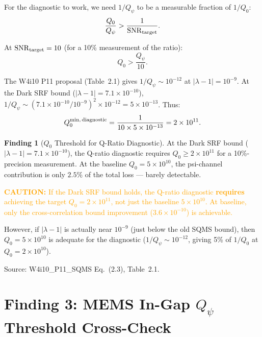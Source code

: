 \documentclass[11pt]{article}
\newcommand{\lbone}{|\lambda - 1|}
\newcommand{\Qpsi}{Q_\psi}
\newcommand{\ee}[1]{\times 10^{#1}}
\newcommand{\SNR}{\mathrm{SNR}}
\newcommand{\caution}[1]{\textcolor{orange}{\textbf{CAUTION:} #1}}
\theoremstyle{definition}
\newtheorem{finding}[theorem]{Finding}
\theoremstyle{remark}
\begin{document}
For the diagnostic to work, we need $1/Q_\psi$ to be a measurable
fraction of $1/Q_0$:
\begin{equation}
\frac{Q_0}{Q_\psi} > \frac{1}{\SNR_{\rm target}}.
\end{equation}

At $\SNR_{\rm target} = 10$ (for a 10\% measurement of the ratio):
\begin{equation}
Q_0 > \frac{Q_\psi}{10}.
\end{equation}

The W4i10 P11 proposal (Table~2.1) gives $1/Q_\psi \sim 10^{-12}$ at
$\lbone = 10^{-9}$. At the Dark SRF bound ($\lbone = 7.1\ee{-10}$),
$1/Q_\psi \sim (7.1\ee{-10}/10^{-9})^2\times 10^{-12} = 5\ee{-13}$.
Thus:
\begin{equation}
Q_0^{\rm min,\,diagnostic} = \frac{1}{10\times 5\ee{-13}} = 2\ee{11}.
\end{equation}

\begin{finding}[$Q_0$ Threshold for Q-Ratio Diagnostic]
\label{find:q0_threshold}
At the Dark SRF bound ($\lbone = 7.1\ee{-10}$), the Q-ratio
diagnostic requires $Q_0 \geq 2\ee{11}$ for a 10\%-precision
measurement. At the baseline $Q_0 = 5\ee{10}$, the psi-channel
contribution is only $2.5\%$ of the total loss --- barely detectable.

\caution{If the Dark SRF bound holds, the Q-ratio diagnostic
\textbf{requires} achieving the target $Q_0 = 2\ee{11}$, not
just the baseline $5\ee{10}$. At baseline, only the cross-correlation
bound improvement ($3.6\ee{-10}$) is achievable.}

However, if $\lbone$ is actually near $10^{-9}$ (just below the
old SQMS bound), then $Q_0 = 5\ee{10}$ is adequate for the diagnostic
($1/Q_\psi \sim 10^{-12}$, giving 5\% of $1/Q_0$ at $Q_0 = 2\ee{10}$).

Source: W4i10\_P11\_SQMS Eq.~(2.3), Table~2.1.
\end{finding}


\part{Finding 3: MEMS In-Gap $\Qpsi$ Threshold Cross-Check}
\label{part:mems}
\end{document}
